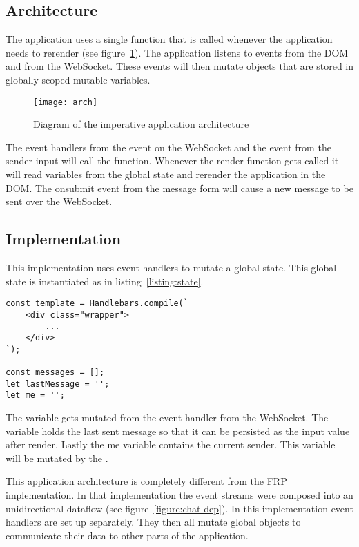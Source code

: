 \subsection{Architecture}

The application uses a single  function that is called whenever the application needs to rerender (see figure~\ref{figure:arch}). The application listens to events from the DOM and from the WebSocket. These events will then mutate objects that are stored in globally scoped mutable variables.

\begin{figure}[H]
	\centering
	\texttt{[image: arch]}
	\caption{Diagram of the imperative application architecture}
	\label{figure:arch}
\end{figure}

The event handlers from the  event on the WebSocket and the  event from the sender input will call the  function. Whenever the render function gets called it will read variables from the global state and rerender the application in the DOM. The onsubmit event from the message form will cause a new message to be sent over the WebSocket.

\subsection{Implementation}

This implementation uses event handlers to mutate a global state. This global state is instantiated as in listing~\ref{listing:state}.

\begin{lstlisting}[caption=The global variables that make up the application state,label=listing:state]
const template = Handlebars.compile(`
	<div class="wrapper">
		...
	</div>
`);

const messages = [];
let lastMessage = '';
let me = '';
\end{lstlisting}

The  variable gets mutated from the  event handler from the WebSocket. The  variable holds the last sent message so that it can be persisted as the input value after render. Lastly the me variable contains the current sender. This variable will be mutated by the .

This application architecture is completely different from the FRP implementation. In that implementation the event streams were composed into an unidirectional dataflow (see figure~\ref{figure:chat-dep}). In this implementation event handlers are set up separately. They then all mutate global objects to communicate their data to other parts of the application. 

